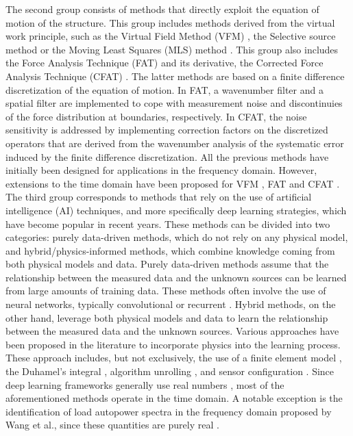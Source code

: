 \documentclass[5p,12pt]{elsarticle}
\begin{document}
The second group consists of methods that directly exploit the equation of motion of the structure. This group includes methods derived from the virtual work principle, such as the Virtual Field Method (VFM) \cite{Ber14}, the Selective source method \cite{Tot18} or the Moving Least Squares (MLS) method \cite{Xu15}. This group also includes the Force Analysis Technique (FAT) \cite{Pez95} and its derivative, the Corrected Force Analysis Technique (CFAT) \cite{Lec12}. The latter methods are based on a finite difference discretization of the equation of motion. In FAT, a wavenumber filter and a spatial filter are implemented to cope with measurement noise and discontinuies of the force distribution at boundaries, respectively. In CFAT, the noise sensitivity is addressed by implementing correction factors on the discretized operators that are derived from the wavenumber analysis of the systematic error induced by the finite difference discretization. All the previous methods have initially been designed for applications in the frequency domain. However, extensions to the time domain have been proposed for VFM \cite{Odo17}, FAT \cite{Auj19} and CFAT \cite{Pez20}. \\
The third group corresponds to methods that rely on the use of artificial intelligence (AI) techniques, and more specifically deep learning strategies, which have become popular in recent years. These methods can be divided into two categories: purely data-driven methods, which do not rely on any physical model, and hybrid/physics-informed methods, which combine knowledge coming from both physical models and data. Purely data-driven methods assume that the relationship between the measured data and the unknown sources can be learned from large amounts of training data. These methods often involve the use of neural networks, typically convolutional \cite{Tab19, Yan23, Zho24} or recurrent \cite{Zho19, Yan21, Esh22, Imp24}. Hybrid methods, on the other hand, leverage both physical models and data to learn the relationship between the measured data and the unknown sources. Various approaches have been proposed in the literature to incorporate physics into the learning process. These approach includes, but not exclusively, the use of a finite element model \cite{Li24}, the Duhamel's integral \cite{Zho24b}, algorithm unrolling \cite{Zho25}, and sensor configuration \cite{Hua23}. Since deep learning frameworks generally use real numbers \cite{Lee22}, most of the aforementioned methods operate in the time domain. A notable exception is the identification of load autopower spectra in the frequency domain proposed by Wang et al., since these quantities are purely real \cite{Wan21}. \\
\end{document}
